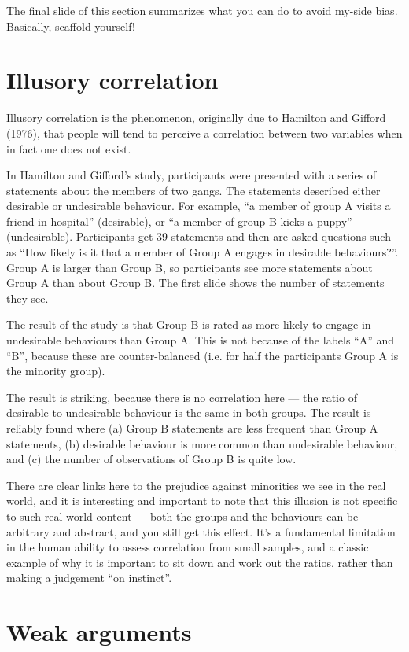 \documentclass[12pt]{article}
\begin{document}
The final slide of this section summarizes what you can do to avoid
my-side bias. Basically, scaffold yourself!

\section{Illusory correlation}

Illusory correlation is the phenomenon, originally due to Hamilton and
Gifford (1976), that people will tend to perceive a correlation
between two variables when in fact one does not exist.

In Hamilton and Gifford's study, participants were presented with a
series of statements about the members of two gangs. The statements
described either desirable or undesirable behaviour. For example, ``a
member of group A visits a friend in hospital'' (desirable), or ``a
member of group B kicks a puppy'' (undesirable). Participants get 39
statements and then are asked questions such as ``How likely is it
that a member of Group A engages in desirable behaviours?''. Group A
is larger than Group B, so participants see more statements about
Group A than about Group B. The first slide shows the number of
statements they see.

The result of the study is that Group B is rated as more likely to
engage in undesirable behaviours than Group A. This is not because of
the labels ``A'' and ``B'', because these are counter-balanced
(i.e. for half the participants Group A is the minority group).

The result is striking, because there is no correlation here --- the
ratio of desirable to undesirable behaviour is the same in both
groups. The result is reliably found where (a) Group B statements are
less frequent than Group A statements, (b) desirable behaviour is more
common than undesirable behaviour, and (c) the number of observations
of Group B is quite low.

There are clear links here to the prejudice against minorities we see
in the real world, and it is interesting and important to note that
this illusion is not specific to such real world content --- both the
groups and the behaviours can be arbitrary and abstract, and you still
get this effect. It's a fundamental limitation in the human ability to
assess correlation from small samples, and a classic example of why it
is important to sit down and work out the ratios, rather than making
a judgement ``on instinct''.

\section{Weak arguments}
\end{document}
